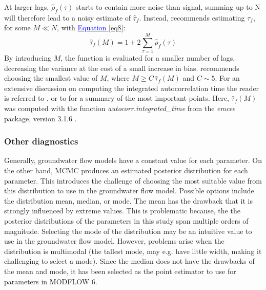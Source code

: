 At larger lags, $\hat{\rho}_f (\tau)$ starts to contain more noise than signal, summing up to N will therefore lead to a noisy estimate of $\hat{\tau}_f$. Instead, \cite{sokal1997monte} recommends estimating $\tau_f$, for some $M \ll N$, with \hyperref[eq8]{\textcolor{blue}{Equation} \ref{eq8}}:  
\begin{equation}\label{eq8}
    \hat{\tau}_f (M) = 1 + 2 \sum_{\tau=1}^{M} \hat{\rho}_f (\tau) 
\end{equation} 
By introducing $M$, the function is evaluated for a smaller number of lags, decreasing the variance at the cost of a small increase in bias.  \cite{sokal1997monte} recommends choosing the smallest value of $M$, where $M \geq C \, \hat{\tau}_f (M)$ and $C \sim 5$. For an extensive discussion on computing the integrated autocorrelation time the reader is referred to %
\cite{sokal1997monte}, or to \cite{foreman2022autocorr} for a summary of the most important points. %
Here, $\hat{\tau}_f (M)$ was computed with the function 
\textit{autocorr.integrated\_time}
from the \textit{emcee} package, version 3.1.6 \citep{foreman2013emcee}.

\subsubsection{Other diagnostics}
Generally, groundwater flow models have a constant value for each parameter. On the other hand, MCMC produces an estimated posterior distribution for each parameter. This introduces the challenge of choosing the most suitable value from this distribution to use in the groundwater flow model. Possible options include the distribution mean, median, or mode. The mean has the drawback that it is strongly influenced by extreme values. This is problematic because, the the posterior distributions of the parameters in this study span multiple orders of magnitude. Selecting the mode of the distribution may be an intuitive value to use in the groundwater flow model. However, problems arise when the distribution is multimodal (the tallest mode, may e.g. have little width, making it challenging to select a mode). Since the median does not have the drawbacks of the mean and mode, it has been selected as the point estimator to use for parameters in MODFLOW 6. %

